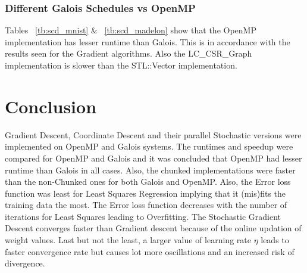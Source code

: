 \documentclass{sigplanconf}
\begin{document}
{\subsubsection{Different Galois Schedules vs OpenMP}
Tables ~\ref{tb:scd_mnist} \& ~\ref{tb:scd_madelon} show that the OpenMP implementation has lesser runtime than Galois. This is in accordance with the results seen for the Gradient
algorithms. Also the LC\_CSR\_Graph implementation is slower than the STL::Vector implementation. 

\section{Conclusion}
Gradient Descent, Coordinate Descent and their parallel Stochastic versions were implemented on OpenMP and Galois systems. The runtimes and speedup
were compared for OpenMP and Galois and it was concluded that OpenMP had lesser runtime than Galois in all cases. Also, the chunked implementations
were faster than the non-Chunked ones for both Galois and OpenMP. Also, the Error loss function was least for Least Squares Regression implying that it
(mis)fits the training data the most. The Error loss function decreases with the number of iterations for Least Squares leading to Overfitting. The Stochastic
Gradient Descent converges faster than Gradient descent because of the online updation of weight values. Last but not the least, a larger value of learning
rate \(\eta\) leads to faster convergence rate but causes lot more oscillations and an increased risk of divergence.

%



\begin{thebibliography}{}
\softraggedright


\end{thebibliography}}
\end{document}
